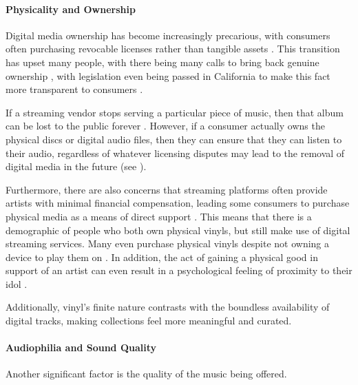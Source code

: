            \paragraph{Physicality and Ownership} %
    
                Digital media ownership has become increasingly precarious, with consumers often purchasing revocable licenses rather than tangible assets \cite{verge2024steam_license}. This transition has upset many people, with there being many calls to bring back genuine ownership \cite{stanton2024gamers_pushback}, with legislation even being passed in California to make this fact more transparent to consumers \cite{california2024ab2426}.
    
                If a streaming vendor stops serving a particular piece of music, then that album can be lost to the public forever \cite{polygon2024cartoon_network_delisting}. However, if a consumer actually owns the physical discs or digital audio files, then they can ensure that they can listen to their audio, regardless of whatever licensing disputes may lead to the removal of digital media in the future (see \cite{bains2022lotr_strategy}).
    
                Furthermore, there are also concerns that streaming platforms often provide artists with minimal financial compensation, leading some consumers to purchase physical media as a means of direct support \cite{historyandrevivalofvinyls}. This means that there is a demographic of people who both own physical vinyls, but still make use of digital streaming services. Many even purchase physical vinyls despite not owning a device to play them on \cite{Trapp2023}. In addition, the act of gaining a physical good in support of an artist can even result in a psychological feeling of proximity to their idol \cite{historyandrevivalofvinyls}.
                
                Additionally, vinyl's finite nature contrasts with the boundless availability of digital tracks, making collections feel more meaningful and curated.
    
            \paragraph{Audiophilia and Sound Quality}
    
                Another significant factor is the quality of the music being offered.
    
